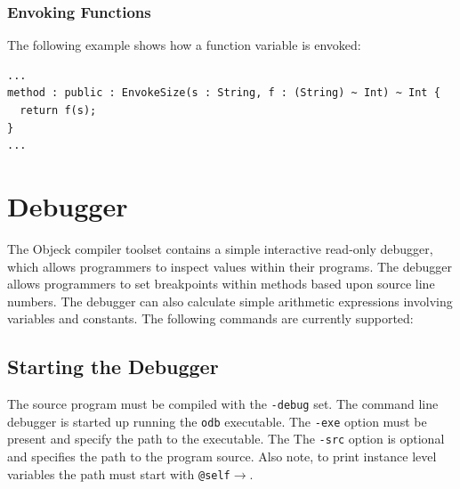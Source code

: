\documentclass[12pt]{article}
\begin{document}
\subsubsection{Envoking Functions}
The following example shows how a function variable is envoked:
\begin{verbatim}
...
method : public : EnvokeSize(s : String, f : (String) ~ Int) ~ Int {
  return f(s);
}
...
\end{verbatim}

\section{Debugger}
The Objeck compiler toolset contains a simple interactive read-only debugger, which allows programmers to inspect values within their programs.  The debugger allows programmers to set breakpoints within methods based upon source line numbers.  The debugger can also calculate simple arithmetic expressions involving variables and constants. The following commands are currently supported:

\subsection{Starting the Debugger}
The source program must be compiled with the \texttt{-debug} set. The command line debugger is started up running the \texttt{odb} executable. The \texttt{-exe} option must be present and specify the path to the executable.  The The \texttt{-src} option is optional and specifies the path to the program source.  Also note, to print instance level variables the path must start with \texttt{@self$\rightarrow$}. 
\end{document}
